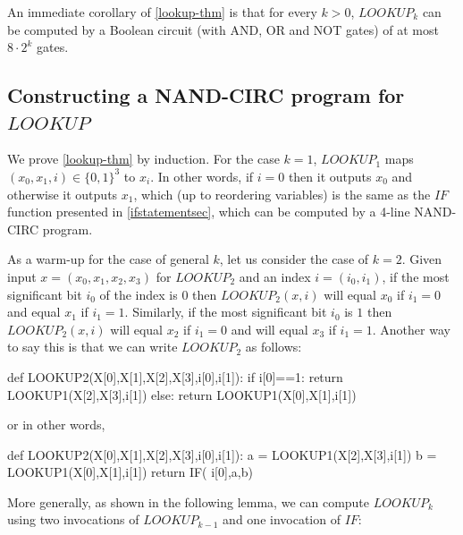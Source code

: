 An immediate corollary of \cref{lookup-thm} is that for every \(k>0\),
\(\ensuremath{\mathit{LOOKUP}}_k\) can be computed by a Boolean circuit
(with AND, OR and NOT gates) of at most \(8 \cdot 2^k\) gates.

\subsection{Constructing a NAND-CIRC program for
\(\ensuremath{\mathit{LOOKUP}}\)}\label{Constructing-a-NAND-CIRC-}

We prove \cref{lookup-thm} by induction. For the case \(k=1\),
\(\ensuremath{\mathit{LOOKUP}}_1\) maps \((x_0,x_1,i) \in \{0,1\}^3\) to
\(x_i\). In other words, if \(i=0\) then it outputs \(x_0\) and
otherwise it outputs \(x_1\), which (up to reordering variables) is the
same as the \(\ensuremath{\mathit{IF}}\) function presented in
\cref{ifstatementsec}, which can be computed by a 4-line NAND-CIRC
program.

As a warm-up for the case of general \(k\), let us consider the case of
\(k=2\). Given input \(x=(x_0,x_1,x_2,x_3)\) for
\(\ensuremath{\mathit{LOOKUP}}_2\) and an index \(i=(i_0,i_1)\), if the
most significant bit \(i_0\) of the index is \(0\) then
\(\ensuremath{\mathit{LOOKUP}}_2(x,i)\) will equal \(x_0\) if \(i_1=0\)
and equal \(x_1\) if \(i_1=1\). Similarly, if the most significant bit
\(i_0\) is \(1\) then \(\ensuremath{\mathit{LOOKUP}}_2(x,i)\) will equal
\(x_2\) if \(i_1=0\) and will equal \(x_3\) if \(i_1=1\). Another way to
say this is that we can write \(\ensuremath{\mathit{LOOKUP}}_2\) as
follows:

\begin{code}
def LOOKUP2(X[0],X[1],X[2],X[3],i[0],i[1]):
    if i[0]==1:
        return LOOKUP1(X[2],X[3],i[1])
    else:
        return LOOKUP1(X[0],X[1],i[1])
\end{code}

or in other words,

\begin{code}
def LOOKUP2(X[0],X[1],X[2],X[3],i[0],i[1]):
    a = LOOKUP1(X[2],X[3],i[1])
    b = LOOKUP1(X[0],X[1],i[1])
    return IF( i[0],a,b)
\end{code}

More generally, as shown in the following lemma, we can compute
\(\ensuremath{\mathit{LOOKUP}}_k\) using two invocations of
\(\ensuremath{\mathit{LOOKUP}}_{k-1}\) and one invocation of
\(\ensuremath{\mathit{IF}}\):

\hypertarget{lookup-rec-lem}{}

